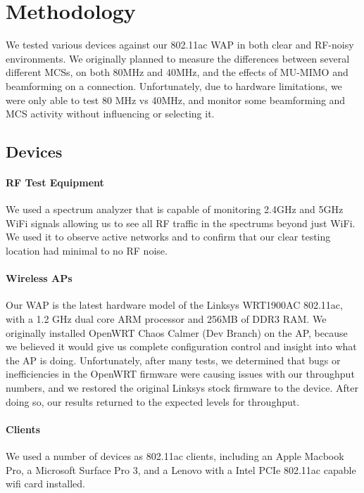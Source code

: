 \section{Methodology}

We tested various devices against our 802.11ac WAP in both clear and RF-noisy
environments. We originally planned to measure the differences between several
different MCSs, on both 80MHz and 40MHz, and the effects of MU-MIMO and
beamforming on a connection. Unfortunately, due to hardware limitations, we were
only able to test 80 MHz vs 40MHz, and monitor some beamforming and MCS activity
without influencing or selecting it.

\subsection{Devices}

\paragraph{RF Test Equipment}

We used a spectrum analyzer that is capable of monitoring 2.4GHz and 5GHz WiFi
signals allowing us to see all RF traffic in the spectrums beyond just WiFi.
We used it to observe active networks and to confirm that our clear testing
location had minimal to no RF noise.

\paragraph{Wireless APs}

Our WAP is the latest hardware model of the Linksys WRT1900AC 802.11ac,
with a 1.2 GHz dual core ARM processor and 256MB of DDR3 RAM. We originally
installed OpenWRT Chaos Calmer (Dev Branch) on the AP, because we believed it
would give us complete configuration control and insight into what the AP is
doing. Unfortunately, after many tests, we determined that bugs or
inefficiencies in the OpenWRT firmware were causing issues with our throughput
numbers, and we restored the original Linksys stock firmware to the device.
After doing so, our results returned to the expected levels for throughput.

\paragraph{Clients}

We used a number of devices as 802.11ac clients, including an Apple Macbook Pro,
a Microsoft Surface Pro 3, and a Lenovo  with a Intel  PCIe
802.11ac capable wifi card installed.

